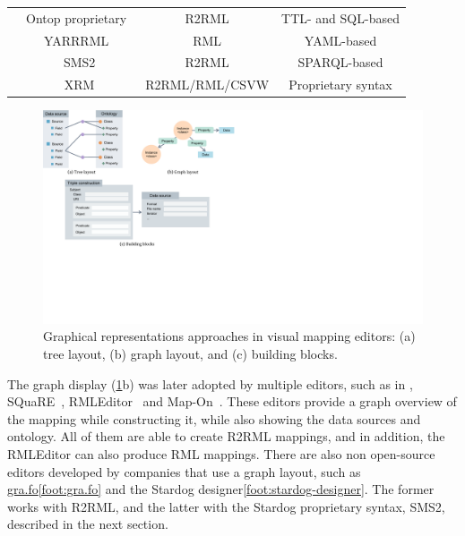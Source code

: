 \begin{table}[t]
{\begin{tabular}{cccc}
 & Ontop proprietary~\parencite{calvanese2017ontop} & R2RML & TTL- and SQL-based \\
 & YARRRML~\parencite{Heyvaert2018yarrrml} & RML & YAML-based \\
 & SMS2\tablefootnote{\label{foot:sms2}\url{https://docs.stardog.com/archive/7.5.0/virtual-graphs/mapping-data-sources.html\#sms2-stardog-mapping-syntax-2}} & R2RML & SPARQL-based \\
 & XRM\tablefootnote{\label{foot:xrm}\url{https://zazuko.com/products/expressive-rdf-mapper/}} & R2RML/RML/CSVW & Proprietary syntax \\ \bottomrule
\end{tabular}
}
\end{table}


\begin{figure}[t]
\centering
\includegraphics[width=0.9\linewidth]{figures/chp2_visual-editors.pdf}
\caption[Graphical representations approaches in visual mapping editors.]{Graphical representations approaches in visual mapping editors: (a) tree layout, (b) graph layout, and (c) building blocks.}
\label{fig:chp2_visual-editors}
\end{figure}


The graph display (\cref{fig:chp2_visual-editors}b) was later adopted by multiple editors, such as in \cite{lembo2014visualization}, SQuaRE~\parencite{blinkiewicz2016square}, RMLEditor~\parencite{heyvaert2016rmleditor} and Map-On~\parencite{sicilia2017map}. These editors provide a graph overview of the mapping while constructing it, while also showing the data sources and ontology. All of them are able to create R2RML mappings, and in addition, the RMLEditor can also produce RML mappings. There are also non open-source editors developed by companies that use a graph layout, such as \url{gra.fo}\cref{foot:gra.fo} and the Stardog designer\cref{foot:stardog-designer}. The former works with R2RML, and the latter with the Stardog proprietary syntax, SMS2, described in the next section. 

